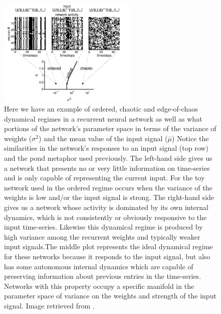 \begin{figure}[h]
\centering
\includegraphics[width=0.6\textwidth]{images/EdgeOfChaos.png}
\caption[Nils Bertschinger and Thomas Natchl\"ager]{Here we have an example of ordered, chaotic and edge-of-chaos dynamical regimes in a recurrent neural network as well as what portions of the network's parameter space in terms of the variance of weights ($\sigma^2$) and the mean value of the input signal ($\bar{\mu}$) Notice the similarities in the network's responses to an input signal (top row) and the pond metaphor used previously. The left-hand side gives us a network that presents no or very little information on time-series and is only capable of representing the current input. For the toy network used in \cite{bertschinger2004real} the ordered regime occurs when the variance of the weights is low and/or the input signal is strong. The right-hand side gives us a network whose activity is dominated by its own internal dynamics, which is not consistently or obviously responsive to the input time-series. Likewise this dynamical regime is produced by high variance among the recurrent weights and typically weaker input signals.The middle plot represents the ideal dynamical regime for these networks because it responds to the input signal, but also has some autonomous internal dynamics which are capable of preserving information about previous entries in the time-series. Networks with this property occupy a specific manifold in the parameter space of variance on the weights and strength of the input signal. Image retrieved from \cite{bertschinger2004real}.}
\label{F:edgechaos}
\end{figure}

